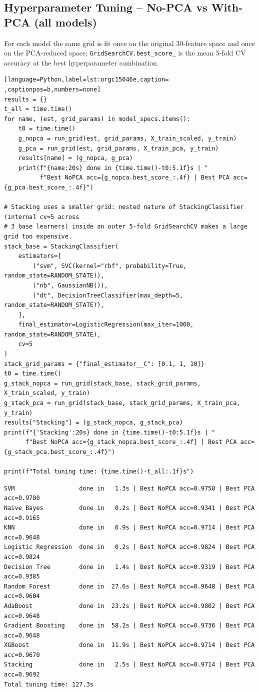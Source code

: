 \documentclass[12pt,a4paper]{article}
\begin{document}
\subsection{Hyperparameter Tuning -- No-PCA vs With-PCA (all models)}
\label{sec:org1f57744}

For each model the same grid is fit once on the original 30-feature space and once on the
PCA-reduced space; \texttt{GridSearchCV.best\_score\_} is the mean 5-fold CV accuracy at the best
hyperparameter combination.

\begin{lstlisting}[language=Python,label=lst:orgc15046e,caption= ,captionpos=b,numbers=none]
results = {}
t_all = time.time()
for name, (est, grid_params) in model_specs.items():
    t0 = time.time()
    g_nopca = run_grid(est, grid_params, X_train_scaled, y_train)
    g_pca = run_grid(est, grid_params, X_train_pca, y_train)
    results[name] = (g_nopca, g_pca)
    print(f"{name:20s} done in {time.time()-t0:5.1f}s | "
          f"Best NoPCA acc={g_nopca.best_score_:.4f} | Best PCA acc={g_pca.best_score_:.4f}")

# Stacking uses a smaller grid: nested nature of StackingClassifier (internal cv=5 across
# 3 base learners) inside an outer 5-fold GridSearchCV makes a large grid too expensive.
stack_base = StackingClassifier(
    estimators=[
        ("svm", SVC(kernel="rbf", probability=True, random_state=RANDOM_STATE)),
        ("nb", GaussianNB()),
        ("dt", DecisionTreeClassifier(max_depth=5, random_state=RANDOM_STATE)),
    ],
    final_estimator=LogisticRegression(max_iter=1000, random_state=RANDOM_STATE),
    cv=5
)
stack_grid_params = {"final_estimator__C": [0.1, 1, 10]}
t0 = time.time()
g_stack_nopca = run_grid(stack_base, stack_grid_params, X_train_scaled, y_train)
g_stack_pca = run_grid(stack_base, stack_grid_params, X_train_pca, y_train)
results["Stacking"] = (g_stack_nopca, g_stack_pca)
print(f"{'Stacking':20s} done in {time.time()-t0:5.1f}s | "
      f"Best NoPCA acc={g_stack_nopca.best_score_:.4f} | Best PCA acc={g_stack_pca.best_score_:.4f}")

print(f"Total tuning time: {time.time()-t_all:.1f}s")
\end{lstlisting}

\begin{verbatim}
SVM                  done in   1.3s | Best NoPCA acc=0.9758 | Best PCA acc=0.9780
Naive Bayes          done in   0.2s | Best NoPCA acc=0.9341 | Best PCA acc=0.9165
KNN                  done in   0.9s | Best NoPCA acc=0.9714 | Best PCA acc=0.9648
Logistic Regression  done in   0.2s | Best NoPCA acc=0.9824 | Best PCA acc=0.9824
Decision Tree        done in   1.4s | Best NoPCA acc=0.9319 | Best PCA acc=0.9385
Random Forest        done in  27.6s | Best NoPCA acc=0.9648 | Best PCA acc=0.9604
AdaBoost             done in  23.2s | Best NoPCA acc=0.9802 | Best PCA acc=0.9648
Gradient Boosting    done in  58.2s | Best NoPCA acc=0.9736 | Best PCA acc=0.9648
XGBoost              done in  11.9s | Best NoPCA acc=0.9714 | Best PCA acc=0.9670
Stacking             done in   2.5s | Best NoPCA acc=0.9714 | Best PCA acc=0.9692
Total tuning time: 127.3s
\end{verbatim}
\end{document}
